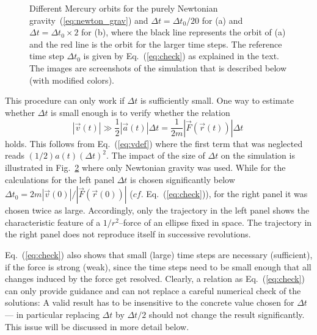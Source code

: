\documentclass[12pt,ngerman,american]{iopart}
\begin{document}
\begin{figure}[htb]
\begin{subfigure}[c]{0.22\textwidth}
		\caption{\label{fig:MercuryOrbit-a0-small-dt-large}}
	\end{subfigure}
	\captionsetup{singlelinecheck=off}
	\caption[]{\label{fig:MercuryOrbit1}
		Different Mercury orbits for the purely Newtonian gravity~(\ref{eq:newton_grav}) and
		 $\Delta t = \Delta t_0  / 20$ for (a) and $\Delta t = \Delta t_0  \times 2$ for (b),
		 where the black line represents the orbit of (a) and the red line is the orbit for the larger time steps.
		The reference time step $\Delta t_0$ is given by Eq.~(\ref{eq:check}) as explained
		in the text.
		The images are screenshots of the simulation that is described below (with modified colors).
	}
\end{figure}

This procedure can only work if $\Delta t$ is sufficiently small.
One way to estimate whether $\Delta t$ is small enough is to verify whether the relation
\begin{equation}
|\vec v(t)| \gg \frac12|\vec a(t)|\Delta t = \frac{1}{2m} |\vec F(\vec r(t)) |\Delta t\
\label{eq:check}
\end{equation}
holds. This follows from Eq.~(\ref{eq:vdef}) where the first term that was neglected reads $(1/2)a(t){(\Delta t)}^2$.
The impact of the size of $\Delta t$ on the simulation is illustrated in Fig.~\ref{fig:MercuryOrbit1} where
only Newtonian gravity was used. While for the
calculations for the left panel $\Delta t$
is chosen significantly below $\Delta t_0=2m |\vec v(0)| /   |\vec F(\vec r(0)) |$ ($cf.$ Eq.~(\ref{eq:check})), for the
right panel it was chosen twice as large. Accordingly, only the trajectory in the left panel shows the characteristic
feature of a $1/r^2$--force of an ellipse fixed in space. The trajectory in the right panel does not reproduce itself in successive revolutions.

Eq.~({\ref{eq:check}}) also shows that small (large) time steps are necessary (sufficient), if the force is strong (weak), since the time steps need to be small enough that all changes induced by the force get resolved.
Clearly, a relation as Eq.~({\ref{eq:check}}) can only provide guidance and can not replace a careful numerical check of the solutions: A valid result has to be insensitive to the concrete value chosen for $\Delta t$ --- in particular replacing $\Delta t$ by $\Delta t/2$ should not change the result significantly.
This issue will be discussed in more detail below.



\end{document}
